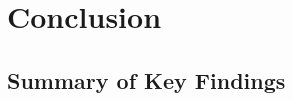 \documentclass[../Dissertation]{subfiles}
\begin{document}
\section{Conclusion}\label{sec:conclusion}
  
  
  
 \subsection{Summary of Key Findings}\label{subsec:key_findings}
 
\end{document}
